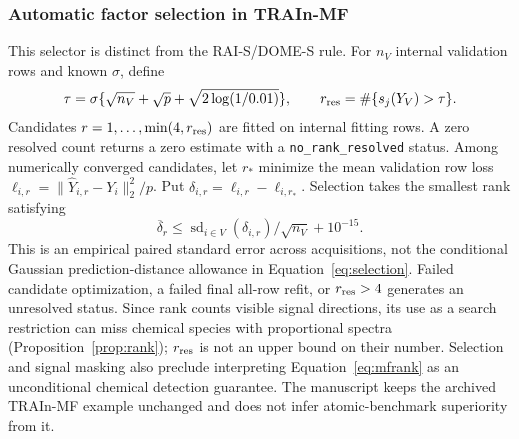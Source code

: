 \subsubsection{Automatic factor selection in TRAIn-MF}
This selector is distinct from the RAI-S/DOME-S rule. For $n_V$ internal validation rows and known $\sigma$, define
\begin{equation}\label{eq:mfrank}
 \tau=\sigma\{\sqrt{n_V}+\sqrt p+\sqrt{2\log(1/0.01)}\},\qquad
 r_{\rm res}=\#\{s_j(Y_V)>\tau\}.
\end{equation}
Candidates $r=1,\ldots,\min(4,r_{\rm res})$ are fitted on internal fitting rows. A zero resolved count returns a zero estimate with a \texttt{no\_rank\_resolved} status. Among numerically converged candidates, let $r_*$ minimize the mean validation row loss $\ell_{i,r}=\|\widehat Y_{i,r}-Y_i\|_2^2/p$. Put $\delta_{i,r}=\ell_{i,r}-\ell_{i,r_*}$. Selection takes the smallest rank satisfying
\begin{equation}\label{eq:mfselect}
 \overline\delta_r\leq
 \operatorname{sd}_{i\in V}(\delta_{i,r})/\sqrt{n_V}+10^{-15}.
\end{equation}
This is an empirical paired standard error across acquisitions, not the conditional Gaussian prediction-distance allowance in Equation~\eqref{eq:selection}. Failed candidate optimization, a failed final all-row refit, or $r_{\rm res}>4$ generates an unresolved status. Since rank counts visible signal directions, its use as a search restriction can miss chemical species with proportional spectra (Proposition~\ref{prop:rank}); $r_{\rm res}$ is not an upper bound on their number. Selection and signal masking also preclude interpreting Equation~\eqref{eq:mfrank} as an unconditional chemical detection guarantee. The manuscript keeps the archived TRAIn-MF example unchanged and does not infer atomic-benchmark superiority from it.

